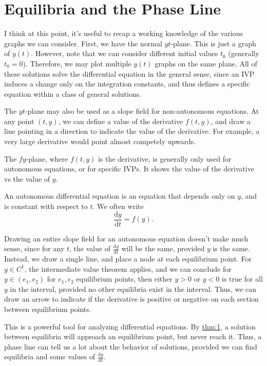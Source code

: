 \section{Equilibria and the Phase Line}
I think at this point, it's useful to recap a working knowledge of the various graphs we can consider. First, we have the normal $yt$-plane. This is just a graph of $y(t)$. However, note that we can consider different initial values $t_0$ (generally $t_0=0$). Therefore, we may plot multiple $y(t)$ graphs on the same plane. All of these solutions solve the differential equation in the general sense, since an IVP induces a change only on the integration constants, and thus defines a specific equation within a class of general solutions.

The $yt$-plane may also be used as a slope field for non-autonomous equations. At any point $(t,y)$, we can define a value of the derivative $f(t,y)$, and draw a line pointing in a direction to indicate the value of the derivative. For example, a very large derivative would point almost competely upwards.

The $fy$-plane, where $f(t,y)$ is the derivative, is generally only used for autonomous equations, or for specific IVPs. It shows the value of the derivative vs the value of $y$.

\begin{definition}\label{dfn:5}
	An autonomous differential equation is an equation that depends only on $y$, and is constant with respect to $t$. We often write
	\[
		\frac{\mathrm{d}y}{\mathrm{d}t} =f(y)
	.\]
\end{definition}

Drawing an entire slope field for an autonomous equation doesn't make much sense, since for any $t$, the value of $\frac{\mathrm{d}y}{\mathrm{d}t} $ will be the same, provided $y$ is the same. Instead, we draw a single line, and place a node at each equilibrium point. For $y\in C^1$, the intermediate value theorem applies, and we can conclude for $y\in (e_1,e_2)$ for $e_1,e_2$ equilibrium points, then either $y>0$ or $y<0$ is true for all $y$ in the interval, provided no other equilibria exist in the interval. Thus, we can draw an arrow to indicate if the derivative is positive or negative on each section between equilibrium points.

This is a powerful tool for analyzing differential equations. By \hyperref[Picard's theorem]{thm:1}, a solution between equilibria will approach an equilibrium point, but never reach it. Thus, a phase line can tell us a lot about the behavior of solutions, provided we can find equilibria and some values of $\frac{\mathrm{d}y}{\mathrm{d}t} $.

